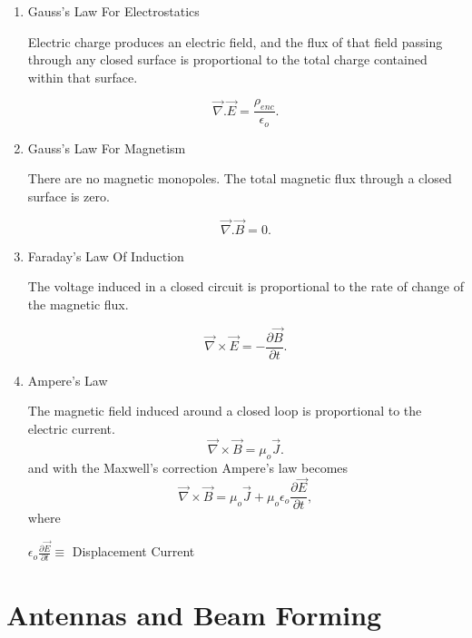 \begin{enumerate}
   \item Gauss's Law For Electrostatics

      Electric charge produces an electric field, and the flux of that field passing through any closed surface is proportional to the total charge contained within that surface.

      \begin{equation}
      \vec{\nabla}.\vec{E} = \frac{\rho_{enc}}{\epsilon_{o}}.
      \end{equation}

   \item Gauss's Law For Magnetism

   There are no magnetic monopoles. The total magnetic flux through a closed surface is zero.

   \begin{equation}
   \vec{\nabla}.\vec{B} = 0.
   \end{equation}

   \item Faraday's Law Of Induction

   The voltage induced in a closed circuit is proportional to the rate of change of the magnetic flux.

   \begin{equation}
   \vec{\nabla}\times\vec{E} = - \frac{\partial\vec{B}}{\partial t}.
   \end{equation}

   \item Ampere's Law

      The magnetic field induced around a closed loop is proportional to the electric current.
      \begin{equation}
      \vec{\nabla}\times\vec{B} =\mu_{o}\vec{J}.
      \end{equation}
      and with the Maxwell's correction Ampere's law becomes
      \begin{equation}
      \vec{\nabla}\times\vec{B} =\mu_{o}\vec{J}+\mu_{o}\epsilon_{o}\frac{\partial\vec{E}}{\partial t},
      \end{equation}
      where

      $\epsilon_{o}\frac{\partial\vec{E}}{\partial t}\equiv$ Displacement Current

\end{enumerate}

\section{Antennas and Beam Forming}

